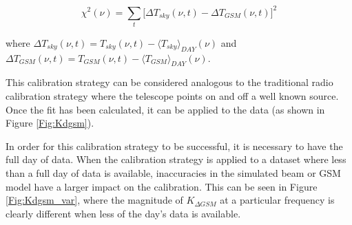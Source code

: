 \begin{equation}
\chi^2(\nu) =  \sum_t \big [ \Delta T_{sky}(\nu,t) - \Delta T_{GSM}(\nu,t) \big ]^2
\end{equation}

where $\Delta T_{sky} (\nu, t) = T_{sky}(\nu,t)-\langle T_{sky} \rangle_{DAY} (\nu)$ and $\Delta T_{GSM} (\nu,t) = T_{GSM}(\nu,t)-\langle T_{GSM} \rangle_{DAY} (\nu)$. 

This calibration strategy can be considered analogous to the traditional radio calibration strategy where the telescope points on and off a well known source. Once the fit has been calculated, it can be applied to the data (as shown in Figure \ref{Fig:Kdgsm}). 

In order for this calibration strategy to be successful, it is necessary to have the full day of data. When the calibration strategy is applied to a dataset where less than a full day of data is available, inaccuracies in the simulated beam or GSM model have a larger impact on the calibration. This can be seen in Figure \ref{Fig:Kdgsm_var}, where the magnitude of $K_{\Delta GSM}$ at a particular frequency is clearly different when less of the day's data is available. 

